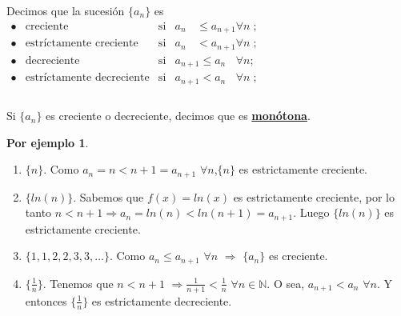 \documentclass{article}
\theoremstyle{definition}
\theoremstyle{definition}
\newtheorem*{ej}{Por ejemplo}
\theoremstyle{remark}
\begin{document}
\begin{defi}
  Decimos que la sucesión $\{a_n\}$ es \\
  $\begin{array}{lcll}
    \bullet & \text{creciente}& \text{si} & a_{n\phantom{+1}} \leq a_{n+1} \forall n \; ; \\

    \bullet & \text{estríctamente creciente} & \text{si} & a_{n\phantom{+1}} < a_{n+1} \forall n \; ; \\
    \bullet &  \text{decreciente} & \text{si} & a_{n+1} \leq a_{n\phantom{+1}}\forall n ; \\ 
    \bullet & \text{estríctamente decreciente} & \text{si} & a_{n+1} < a_{n\phantom{+1}} \forall n \; ; \\

  \end{array}$ \\\\
  Si $\{a_{n}\}$ es creciente o decreciente, decimos que es \textbf{\underline{monótona}}.

\end{defi}

\begin{ej}
  \begin{enumerate} \; \\

    \item $\{n\}$. Como $a_n=n<n+1=a_{n+1}$ $\forall n$,$\{n\}$ es estrictamente creciente.
    \item $\{ln(n)\}$. Sabemos que $f(x)=ln(x)$ es estrictamente creciente, por lo tanto $n<n+1 \Rightarrow a_n=ln(n)<ln(n+1)=a_{n+1}$. Luego $\{ln(n)\}$ es estrictamente creciente. 
       \item $\{1,1,2,2,3,3,\dots\}$. Como $a_n \leq a_{n+1}$ $\forall n $ $ \Rightarrow $ $\{a_n\}$ es creciente.
    \item $\{\frac{1}{n}\}$. Tenemos que $n<{n+1}$ $\Rightarrow \frac{1}{n+1} < \frac{1}{n}$ $\forall n \in \mathbb{N}$. O sea, $a_{n+1}<a_n$ $\forall n$. Y entonces $\{\frac{1}{n}\}$ es estrictamente decreciente.

  \end{enumerate}
\end{ej} 
\end{document}
